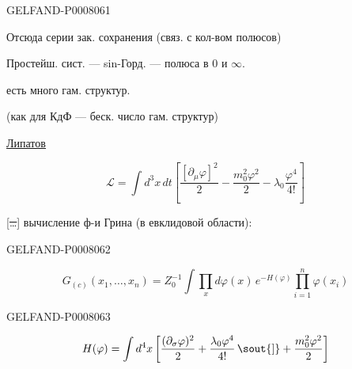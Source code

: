 \begin{GelfandAdjacentEvidence}{GELFAND-P000806}{1}

Отсюда серии зак. сохранения (связ. с кол-вом полюсов)


Простейш. сист. --- sin-Горд. --- полюса в \(0\) и \(\infty\).

 есть много гам. структур.

(как для КдФ --- беск. число гам. структур)

\underline{\underline{Липатов}}


\begin{center}
\end{center}
\begin{equation*}
\mathcal L=\int d^3x\,dt\left[
\frac{[\partial_\mu\varphi]^2}{2}
-\frac{m_0^2\varphi^2}{2}
-\lambda_0\frac{\varphi^4}{4!}\right]
\tag{1}
\end{equation*}

 [\sout{\ldots}] вычисление ф-и Грина (в евклидовой области):
\end{GelfandAdjacentEvidence}
\begin{GelfandAdjacentEvidence}{GELFAND-P000806}{2}

\begin{equation*}
G_{(c)}(x_1,\ldots,x_n)
=Z_0^{-1}\int\prod_x d\varphi(x)\,e^{-H(\varphi)}
\prod_{i=1}^{n}\varphi(x_i)
\tag{2}
\end{equation*}
\end{GelfandAdjacentEvidence}
\begin{GelfandAdjacentEvidence}{GELFAND-P000806}{3}

\[
H(\varphi)=\int d^4x\left[
\frac{(\partial_\sigma\varphi)^2}{2}
+\frac{\lambda_0\varphi^4}{4!}\,\text{\sout{]}}
+\frac{m_0^2\varphi^2}{2}\right]
\]
\end{GelfandAdjacentEvidence}
